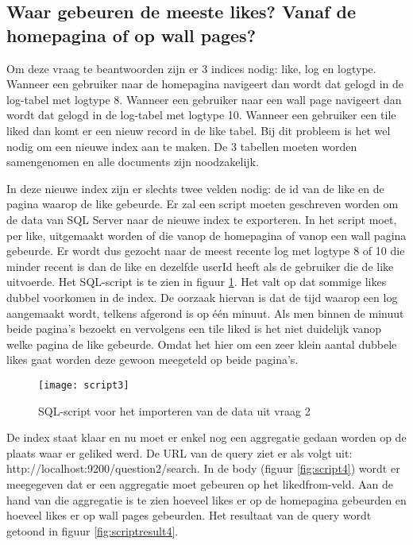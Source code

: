 \subsection{Waar gebeuren de meeste likes? Vanaf de homepagina of op wall pages?}
Om deze vraag te beantwoorden zijn er 3 indices nodig: like, log en logtype. Wanneer een gebruiker naar de homepagina navigeert dan wordt dat gelogd in de log-tabel met logtype 8. Wanneer een gebruiker naar een wall page navigeert dan wordt dat gelogd in de log-tabel met logtype 10. Wanneer een gebruiker een tile liked dan komt er een nieuw record in de like tabel. Bij dit probleem is het wel nodig om een nieuwe index aan te maken. De 3 tabellen moeten worden samengenomen en alle documents zijn noodzakelijk.

In deze nieuwe index zijn er slechts twee velden nodig: de id van de like en de pagina waarop de like gebeurde. Er zal een script moeten geschreven worden om de data van SQL Server naar de nieuwe index te exporteren. In het script moet, per like, uitgemaakt worden of die vanop de homepagina of vanop een wall pagina gebeurde. Er wordt dus gezocht naar de meest recente log met logtype 8 of 10 die minder recent is dan de like en dezelfde userId heeft als de gebruiker die de like uitvoerde. Het SQL-script is te zien in figuur \ref{fig:script3}. Het valt op dat sommige likes dubbel voorkomen in de index. De oorzaak hiervan is dat de tijd waarop een log aangemaakt wordt, telkens afgerond is op één minuut. Als men binnen de minuut beide pagina's bezoekt en vervolgens een tile liked is het niet duidelijk vanop welke pagina de like gebeurde. Omdat het hier om een zeer klein aantal dubbele likes gaat worden deze gewoon meegeteld op beide pagina's.

\begin{figure}
	\centering
	\texttt{[image: script3]}
	\caption{SQL-script voor het importeren van de data uit vraag 2}
	\label{fig:script3}
\end{figure}

De index staat klaar en nu moet er enkel nog een aggregatie gedaan worden op de plaats waar er geliked werd. De URL van de query ziet er als volgt uit: http://localhost:9200/question2/\textunderscore search. In de body (figuur \ref{fig:script4}) wordt er meegegeven dat er een aggregatie moet gebeuren op het liked\textunderscore from-veld. Aan de hand van die aggregatie is te zien hoeveel likes er op de homepagina gebeurden en hoeveel likes er op wall pages gebeurden. Het resultaat van de query wordt getoond in figuur \ref{fig:scriptresult4}.

